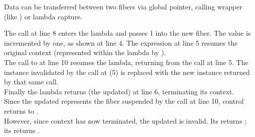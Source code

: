 
Data can be transferred between two fibers via global pointer, calling
wrapper (like ) or lambda capture.

The \resume call at line 8 enters the lambda and passes 1 into the
new fiber. The value is incremented by one, as shown at line 4. The expression
 at line 5 resumes the original context (represented
within the lambda by ).\\
The call to  at line 10 resumes the lambda, returning from
the  call at line 5. The \fiber instance 
invalidated by the \resume call at (5) is replaced with the new instance
returned by that same \resume call.\\
Finally the lambda returns (the updated)  at line 6, terminating its
context.\\

Since the updated  represents the fiber suspended by the call at
line 10, control returns to \main.\\

However, since context  has now terminated, the updated 
is invalid. Its \opbool returns ; its  returns
.\\

